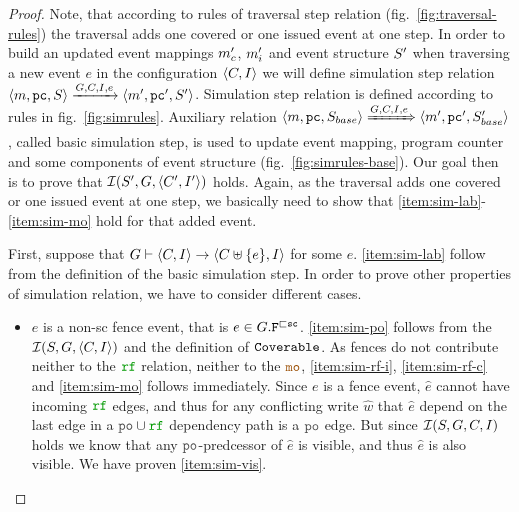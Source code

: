 \documentclass[12pt]{article}
\begin{document}
\begin{proof}
  
  Note, that according to rules of traversal step relation (fig.~\ref{fig:traversal-rules})
  the traversal adds one covered or one issued event at one step.
  In order to build an updated event mappings $m_{c}'$, $m_{i}'$ 
  and event structure $S'$ 
  when traversing a new event $e$ in the configuration $\langle C, I \rangle$
  we will define simulation step relation 
  $\langle m, {\mathtt{pc}}, S \rangle \xrightarrow{G, C, I, e} \langle m', {\mathtt{pc}}', S' \rangle$.
  Simulation step relation is defined according to rules in fig.~\ref{fig:simrules}.
  Auxiliary relation 
  $\langle m, {\mathtt{pc}}, S_{base} \rangle \xRightarrow{G, C, I, e} \langle m', {\mathtt{pc}}', S'_{base} \rangle$,
  called basic simulation step, 
  is used to update event mapping, program counter and some components of event structure
  (fig.~\ref{fig:simrules-base}).
  Our goal then is to prove that $\mathcal{I}(S', G, \langle C', I' \rangle)$ holds.
  Again, as the traversal adds one covered or one issued event at one step,
  we basically need to show that \ref{item:sim-lab}-\ref{item:sim-mo} hold
  for that added event.

  First, suppose that 
  $G \vdash \langle C, I \rangle \rightarrow \langle C \uplus \{e\}, I \rangle$ for some $e$.
  \ref{item:sim-lab} follow from the definition of the basic simulation step.
  In order to prove other properties of simulation relation,
  we have to consider different cases.

  \begin{itemize}
    \item $e$ is a non-sc fence event, that is $e \in G.{\mathtt{F}}^{\sqsubset{\mathtt{sc}}}$.
      \ref{item:sim-po} follows from the $\mathcal{I}(S, G, \langle C, I \rangle)$ 
      and the definition of ${\mathtt{Coverable}}$.
      As fences do not contribute neither to the $\lRF$ relation, neither to the $\lMO$, 
      \ref{item:sim-rf-i}, \ref{item:sim-rf-c} and \ref{item:sim-mo} follows immediately.
      Since $e$ is a fence event, $\hat{e}$ cannot have incoming $\lRF$ edges,
      and thus for any conflicting write $\hat{w}$ that $\hat{e}$ depend on
      the last edge in a $\lPO \cup \lRF$ dependency path is a $\lPO$ edge.
      But since $\mathcal{I}(S, G, C, I)$ holds we know that 
      any $\lPO$-predcessor of $\hat{e}$ is visible, and thus $\hat{e}$ is also visible.
      We have proven \ref{item:sim-vis}.


\end{itemize}
\end{proof}
\end{document}
